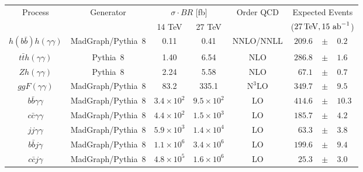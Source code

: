 \begingroup
\renewcommand*{\arraystretch}{.7}
\begin{table}
\centering
\begin{tabular}{|c|c|cc|c|rcl|}
\hline
\multirow{2}{*}{Process}     & \multirow{2}{*}{Generator} & \multicolumn{2}{c|}{$\sigma \cdot BR$ {[}fb{]}} & \multirow{2}{*}{Order QCD} & \multicolumn{3}{c|}{Expected Events} \\
                              			&                   							& 14 TeV  			& 27 TeV  			&		& \multicolumn{3}{c|}{($27\, {\rm TeV}, 15~\text{ab}^{-1}$)} \\ \hline
$h(b\bar{b})h(\gamma\gamma)$  	& {\sc\small MadGraph}/{\sc\small Pythia~8} 	& 0.11      			& 0.41      			& NNLO/NNLL								& $209.6$		& $\pm$ & $0.2$ \\ \hline
$t\bar{t}h(\gamma\gamma)$     		& {\sc\small Pythia~8}           			& 1.40      			& 6.54      			& NLO  										& $286.8$		& $\pm$ & $1.6$\\
$Zh(\gamma\gamma)$            		& {\sc\small Pythia~8}           			& 2.24      			& 5.58      			& NLO 											& $67.1$ 		& $\pm$ & $0.7$ \\
$ggF(\gamma\gamma)$           		& {\sc\small MadGraph}/{\sc\small Pythia~8} 	& 83.2      			& 335.1     		& $\text{N}^{3}\text{LO}$ 				& $349.7$ 	& $\pm$ & $9.5$ \\ \hline
$b\bar{b}\gamma\gamma$        	& {\sc\small MadGraph}/{\sc\small Pythia~8} 	& $3.4\times 10^{2}$     & $9.5\times 10^{2}$     & LO 					& $414.6$ 	& $\pm$ & $10.3$ \\
$c\bar{c}\gamma\gamma$        		& {\sc\small MadGraph}/{\sc\small Pythia~8} 	& $4.4\times 10^{2}$     & $1.5\times 10^{3}$     & LO 					& $185.7$ 	& $\pm$ & $4.2$ \\
$jj\gamma\gamma$              			& {\sc\small MadGraph}/{\sc\small Pythia~8} 	& $5.9\times 10^{3}$     & $1.4\times 10^{4}$     & LO 					& $63.3$ 		& $\pm$ & $3.8$ \\
$b\bar{b}j\gamma$             			& {\sc\small MadGraph}/{\sc\small Pythia~8} 	& $1.1\times 10^{6}$     & $3.4\times 10^{6}$     & LO 					& $199.6$ 	& $\pm$ & $9.4$ \\
$c\bar{c}j\gamma$             			& {\sc\small MadGraph}/{\sc\small Pythia~8} 	& $4.8\times 10^{5}$     	& $1.6\times 10^{6}$     & LO 				& $25.3$ 		& $\pm$ & $3.0$ \\

\end{tabular}
\end{table}
